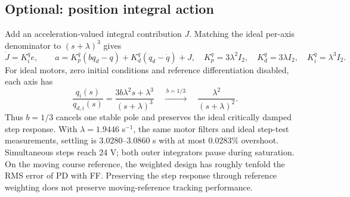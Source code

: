 \subsection*{Optional: position integral action}
Add an acceleration-valued integral contribution $J$. Matching the ideal per-axis denominator to $(s+\lambda)^3$ gives
\begin{equation}
\dot J=K_i^qe,\qquad a=K_p^q(bq_d-q)+K_d^q(\dot q_d-\dot q)+J,
\quad K_p^q=3\lambda^2I_2,\quad K_d^q=3\lambda I_2,\quad K_i^q=\lambda^3I_2.
\end{equation}
For ideal motors, zero initial conditions and reference differentiation disabled, each axis has
\[
\frac{q_i(s)}{q_{d,i}(s)}=\frac{3b\lambda^2s+\lambda^3}{(s+\lambda)^3}
\quad\xrightarrow{\ b=1/3\ }\quad\frac{\lambda^2}{(s+\lambda)^2}.
\]
Thus $b=1/3$ cancels one stable pole and preserves the ideal critically damped step response. With $\lambda=1.9446$ s$^{-1}$, the same motor filters and ideal step-test measurements, settling is 3.0280--3.0860 s with at most 0.0283\% overshoot. Simultaneous steps reach 24 V; both outer integrators pause during saturation. On the moving course reference, the weighted design has roughly tenfold the RMS error of PD with FF. Preserving the step response through reference weighting does not preserve moving-reference tracking performance.
